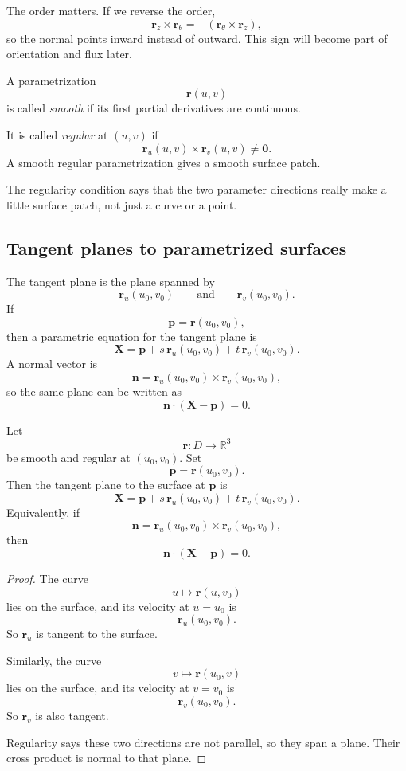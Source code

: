 The order matters.  If we reverse the order,
\[
    \mathbf r_z\times \mathbf r_\theta
    =
    -(\mathbf r_\theta\times \mathbf r_z),
\]
so the normal points inward instead of outward.  This sign will become part of
orientation and flux later.

\begin{definition}
A parametrization
\[
    \mathbf r(u,v)
\]
is called \emph{smooth} if its first partial derivatives are continuous.

It is called \emph{regular} at \((u,v)\) if
\[
\boxed{
    \mathbf r_u(u,v)\times \mathbf r_v(u,v)\ne \mathbf 0.
}
\]
A smooth regular parametrization gives a smooth surface patch.
\end{definition}

The regularity condition says that the two parameter directions really make a little
surface patch, not just a curve or a point.

\subsection{Tangent planes to parametrized surfaces}

The tangent plane is the plane spanned by
\[
    \mathbf r_u(u_0,v_0)
    \qquad\text{and}\qquad
    \mathbf r_v(u_0,v_0).
\]
If
\[
    \mathbf p=\mathbf r(u_0,v_0),
\]
then a parametric equation for the tangent plane is
\[
\boxed{
    \mathbf X=\mathbf p+s\,\mathbf r_u(u_0,v_0)+t\,\mathbf r_v(u_0,v_0).
}
\]
A normal vector is
\[
    \mathbf n=\mathbf r_u(u_0,v_0)\times \mathbf r_v(u_0,v_0),
\]
so the same plane can be written as
\[
\boxed{
    \mathbf n\cdot(\mathbf X-\mathbf p)=0.
}
\]

\begin{theorem}
Let
\[
    \mathbf r:D\to\mathbb R^3
\]
be smooth and regular at \((u_0,v_0)\).  Set
\[
    \mathbf p=\mathbf r(u_0,v_0).
\]
Then the tangent plane to the surface at \(\mathbf p\) is
\[
\boxed{
    \mathbf X=\mathbf p+s\,\mathbf r_u(u_0,v_0)+t\,\mathbf r_v(u_0,v_0).
}
\]
Equivalently, if
\[
    \mathbf n=\mathbf r_u(u_0,v_0)\times \mathbf r_v(u_0,v_0),
\]
then
\[
\boxed{
    \mathbf n\cdot(\mathbf X-\mathbf p)=0.
}
\]
\end{theorem}

\begin{proof}
The curve
\[
    u\longmapsto \mathbf r(u,v_0)
\]
lies on the surface, and its velocity at \(u=u_0\) is
\[
    \mathbf r_u(u_0,v_0).
\]
So \(\mathbf r_u\) is tangent to the surface.

Similarly, the curve
\[
    v\longmapsto \mathbf r(u_0,v)
\]
lies on the surface, and its velocity at \(v=v_0\) is
\[
    \mathbf r_v(u_0,v_0).
\]
So \(\mathbf r_v\) is also tangent.

Regularity says these two directions are not parallel, so they span a plane.  Their
cross product is normal to that plane.
\end{proof}

